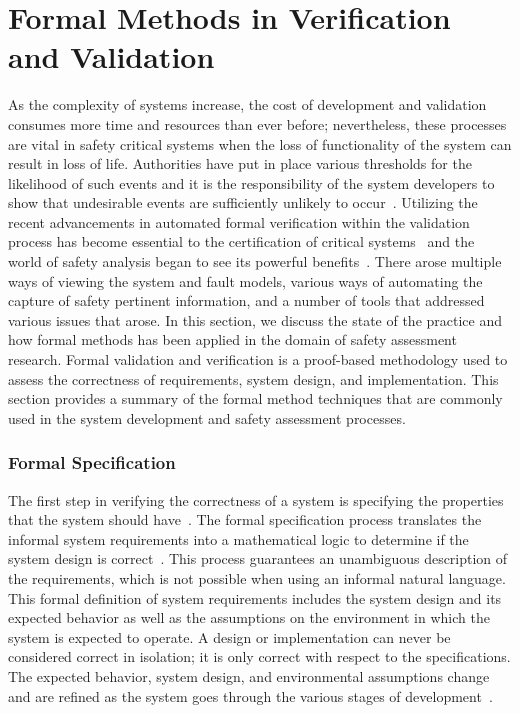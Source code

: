 \section{Formal Methods in Verification and Validation}
\label{sec:fm}
As the complexity of systems increase, the cost of development and validation consumes more time and resources than ever before; nevertheless, these processes are vital in safety critical systems when the loss of functionality of the system can result in loss of life. Authorities have put in place various thresholds for the likelihood of such events and it is the responsibility of the system developers to show that undesirable events are sufficiently unlikely to occur~\cite{faaSA}. Utilizing the recent advancements in automated formal verification within the validation process has become essential to the certification of critical systems~\cite{deptOfDefense,standard1999,prasad2005survey} and the world of safety analysis began to see its powerful benefits~\cite{hinchey2012industrial, liggesmeyer1998improving, coudert1993fault, Bozzano:2010:DSA:1951720,bozzano2003esacs}. There arose multiple ways of viewing the system and fault models, various ways of automating the capture of safety pertinent information, and a number of tools that addressed various issues that arose. In this section, we discuss the state of the practice and how formal methods has been applied in the domain of safety assessment research. Formal validation and verification is a proof-based methodology used to assess the correctness of requirements, system design, and implementation. This section provides a summary of the formal method techniques that are commonly used in the system development and safety assessment processes.

\subsubsection{Formal Specification}
\label{sec:formalSpec}
The first step in verifying the correctness of a system is specifying the properties that the system should have~\cite{clarke2018model}. The formal specification process translates the informal system requirements into a mathematical logic to determine if the system design is correct~\cite{hinchey2012industrial}. This process guarantees an unambiguous description of the requirements, which is not possible when using an informal natural language. This formal definition of system requirements includes the system design and its expected behavior as well as the assumptions on the environment in which the system is expected to operate. A design or implementation can never be considered correct in isolation; it is only correct with respect to the specifications. The expected behavior, system design, and environmental assumptions change and are refined as the system goes through the various stages of development~\cite{lamsweerde2000formal}. 

